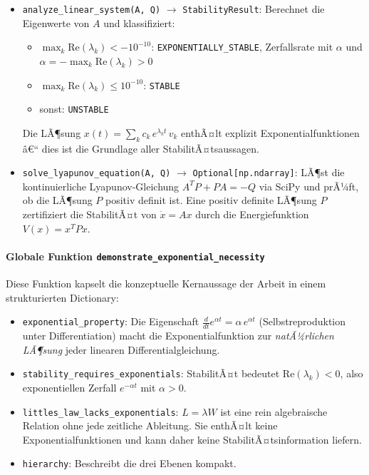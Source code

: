 ﻿\documentclass[a4paper,12pt]{scrreprt}
\theoremstyle{definition}
\begin{document}
\begin{itemize}
	\item \texttt{analyze\_linear\_system(A, Q)} $\to$
	\texttt{StabilityResult}:  Berechnet die Eigenwerte von $A$
	und klassifiziert:
	\begin{itemize}
		\item $\max_k \text{Re}(\lambda_k) < -10^{-10}$:
		\texttt{EXPONENTIALLY\_STABLE}, Zerfallsrate mit $\alpha$ und
		$\alpha = -\max_k \text{Re}(\lambda_k) > 0$
		\item $\max_k \text{Re}(\lambda_k) \leq 10^{-10}$:
		\texttt{STABLE}
		\item sonst: \texttt{UNSTABLE}
	\end{itemize}
	Die LÃ¶sung $x(t) = \sum_k c_k\, e^{\lambda_k t}\, v_k$
	enthÃ¤lt explizit Exponentialfunktionen â€“ dies ist die
	Grundlage aller StabilitÃ¤tsaussagen.
	
	\item \texttt{solve\_lyapunov\_equation(A, Q)} $\to$
	\texttt{Optional[np.ndarray]}:  LÃ¶st die kontinuierliche
	Lyapunov-Gleichung $A^T P + P A = -Q$ via SciPy und prÃ¼ft,
	ob die LÃ¶sung $P$ positiv definit ist.  Eine positiv definite
	LÃ¶sung $P$ zertifiziert die StabilitÃ¤t von $\dot{x} = Ax$
	durch die Energiefunktion $V(x) = x^T P x$.
\end{itemize}

\paragraph{Globale Funktion \texttt{demonstrate\_exponential\_necessity}}

Diese Funktion kapselt die konzeptuelle Kernaussage der Arbeit in
einem strukturierten Dictionary:

\begin{itemize}
	\item \texttt{exponential\_property}: Die Eigenschaft
	$\frac{d}{dt}e^{\alpha t} = \alpha\,e^{\alpha t}$
	(Selbstreproduktion unter Differentiation) macht die
	Exponentialfunktion zur \emph{natÃ¼rlichen LÃ¶sung} jeder
	linearen Differentialgleichung.
	\item \texttt{stability\_requires\_exponentials}: StabilitÃ¤t
	bedeutet $\text{Re}(\lambda_k) < 0$, also exponentiellen
	Zerfall $e^{-\alpha t}$ mit $\alpha > 0$.
	\item \texttt{littles\_law\_lacks\_exponentials}: $L = \lambda W$
	ist eine rein algebraische Relation ohne jede zeitliche
	Ableitung.  Sie enthÃ¤lt keine Exponentialfunktionen und
	kann daher keine StabilitÃ¤tsinformation liefern.
	\item \texttt{hierarchy}: Beschreibt die drei Ebenen kompakt.
\end{itemize}
\end{document}

